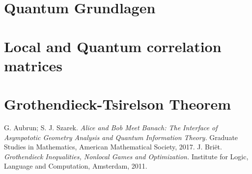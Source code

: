 \newpage
\section{Quantum Grundlagen} %
	\vspace{8pt}
	


\section{Local and Quantum correlation matrices} %
	\vspace{8pt}

	
\section{Grothendieck-Tsirelson Theorem} %
	
 
 
\appendix

		


%
\newpage 
\begin{thebibliography}{999}
	
	
	 G. Aubrun; S. J. Szarek. {\em Alice and Bob Meet Banach: The Interface of Asympototic Geometry Analysis and Quantum Information Theory.} Graduate Studies in Mathematics, American Mathematical Society, 2017.
	J. Bri\"{e}t. {\em Grothendieck Inequalities, Nonlocal Games and Optimization.} Institute for Logic, Language and Computation, Amsterdam, 2011.
	
	
	
\end{thebibliography}
	
